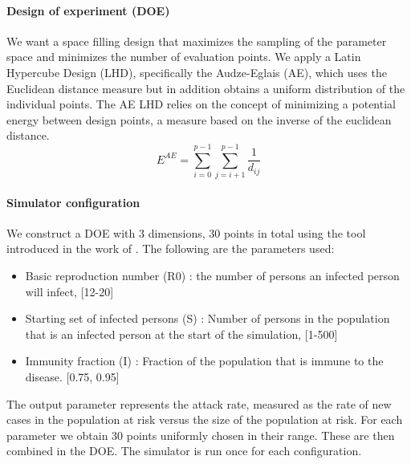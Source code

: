 \paragraph{Design of experiment (DOE)}
We want a space filling design that maximizes the sampling of the parameter space and minimizes the number of evaluation points. We apply a Latin Hypercube Design (LHD), specifically the Audze-Eglais \citep{AudzeEglais, AudzeEglais2, AudzeEglais3} (AE), which uses the Euclidean distance measure but in addition obtains a uniform distribution of the individual points. The AE LHD relies on the concept of minimizing a potential energy between design points, a measure based on the inverse of the euclidean distance.
\[
E^{AE} = \sum_{i=0}^{p-1} {\sum_{j=i+1}^{p-1} {\frac{1}{d_{ij}}}}
\]

\paragraph{Simulator configuration}
We construct a DOE with 3 dimensions, 30 points in total using the tool introduced in the work of \citep{DOE}. The following are the parameters used:
\begin{itemize}
\item Basic reproduction number (R0) : the number of persons an infected person will infect, [12-20]
\item Starting set of infected persons (S) : Number of persons in the population that is an infected person at the start of the simulation, [1-500]
\item Immunity fraction (I) : Fraction of the population that is immune to the disease. [0.75, 0.95]
\end{itemize}
The output parameter represents the attack rate, measured as the rate of new cases in the population at risk versus the size of the population at risk. For each parameter we obtain 30 points uniformly chosen in their range. These are then combined in the DOE. The simulator is run once for each configuration. 

